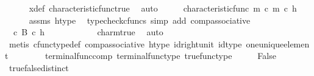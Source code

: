 \begin{isabellebody}
\ \ \ \ \isamarkupfalse%
\ x{\isacharunderscore}{\kern0pt}def\ characteristic{\isacharunderscore}{\kern0pt}func{\isacharunderscore}{\kern0pt}true\ \isamarkupfalse%
\ auto\isanewline
\ \ \isamarkupfalse%
\ \isamarkupfalse%
\ {\isachardoublequoteopen}{\isacharparenleft}{\kern0pt}characteristic{\isacharunderscore}{\kern0pt}func\ m\ {\isasymcirc}\isactrlsub c\ m{\isacharparenright}{\kern0pt}\ {\isasymcirc}\isactrlsub c\ h\ {\isacharequal}{\kern0pt}\ {\isasymf}{\isachardoublequoteclose}\isanewline
\ \ \ \ \isamarkupfalse%
\ assms\ h{\isacharunderscore}{\kern0pt}type\ \isamarkupfalse%
\ {\isacharparenleft}{\kern0pt}typecheck{\isacharunderscore}{\kern0pt}cfuncs{\isacharcomma}{\kern0pt}\ simp\ add{\isacharcolon}{\kern0pt}\ comp{\isacharunderscore}{\kern0pt}associative{}{\isacharparenright}{\kern0pt}\isanewline
\ \ \isamarkupfalse%
\ \isamarkupfalse%
\ {\isachardoublequoteopen}{\isacharparenleft}{\kern0pt}{\isasymt}\ {\isasymcirc}\isactrlsub c\ {\isasymbeta}\isactrlbsub B\isactrlesub {\isacharparenright}{\kern0pt}\ {\isasymcirc}\isactrlsub c\ h\ {\isacharequal}{\kern0pt}\ {\isasymf}{\isachardoublequoteclose}\ \ \ \ \isanewline
\ \ \ \ \isamarkupfalse%
\ char{\isacharunderscore}{\kern0pt}m{\isacharunderscore}{\kern0pt}true\ \isamarkupfalse%
\ auto\isanewline
\ \ \isamarkupfalse%
\ \isamarkupfalse%
\ {\isachardoublequoteopen}{\isasymt}\ {\isacharequal}{\kern0pt}\ {\isasymf}{\isachardoublequoteclose}\isanewline
\ \ \ \ \isamarkupfalse%
\ {\isacharparenleft}{\kern0pt}metis\ cfunc{\isacharunderscore}{\kern0pt}type{\isacharunderscore}{\kern0pt}def\ comp{\isacharunderscore}{\kern0pt}associative\ h{\isacharunderscore}{\kern0pt}type\ id{\isacharunderscore}{\kern0pt}right{\isacharunderscore}{\kern0pt}unit{}\ id{\isacharunderscore}{\kern0pt}type\ one{\isacharunderscore}{\kern0pt}unique{\isacharunderscore}{\kern0pt}element\isanewline
\ \ \ \ \ \ \ \ terminal{\isacharunderscore}{\kern0pt}func{\isacharunderscore}{\kern0pt}comp\ terminal{\isacharunderscore}{\kern0pt}func{\isacharunderscore}{\kern0pt}type\ true{\isacharunderscore}{\kern0pt}func{\isacharunderscore}{\kern0pt}type{\isacharparenright}{\kern0pt}\isanewline
\ \ \isamarkupfalse%
\ \isamarkupfalse%
\ {\isachardoublequoteopen}False{\isachardoublequoteclose}\isanewline
\ \ \ \ \isamarkupfalse%
\ true{\isacharunderscore}{\kern0pt}false{\isacharunderscore}{\kern0pt}distinct\ \isamarkupfalse%

\end{isabellebody}
